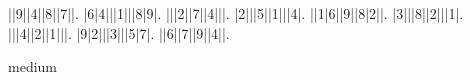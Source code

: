 \begin{sudoku}
||9||4||8||7||.
|6|4|||1|||8|9|.
|||2||7||4|||.
|2|||5||1|||4|.
||1|6||9||8|2||.
|3|||8||2|||1|.
|||4||2||1|||.
|9|2|||3|||5|7|.
||6||7||9||4||.
\end{sudoku}
\begin{center}
medium\end{center}